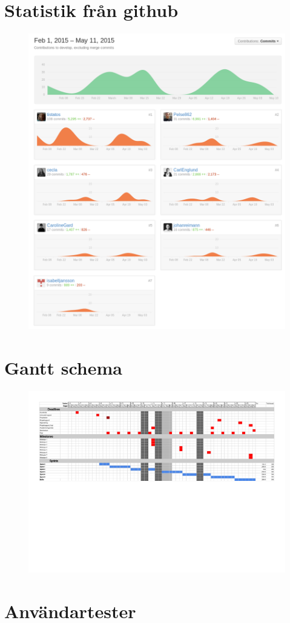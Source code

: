 \documentclass[a4paper,12pt,oneside,final]{extbook}
\begin{document}
\chapter{Statistik från github}
\begin{figure}[h]
  \centering
  \includegraphics[scale=0.4]{bilder/gitstats.png}
  \label{fig:gitstats}
\end{figure}

\newpage
\chapter{Gantt schema}\label{app:gantt}
\begin{figure}[h]
\includegraphics[angle=270,origin=c,scale=0.62]{Ganttschema.pdf}
\end{figure}

\newpage
\chapter{Användartester}\label{app:anvandartest}

\end{document}
